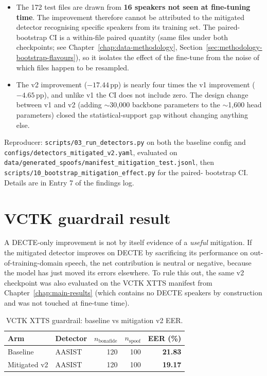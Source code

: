 \begin{itemize}
    \item The 172 test files are drawn from \textbf{16 speakers not seen at
        fine-tuning time}. The improvement therefore cannot be
        attributed to the mitigated detector recognising specific
        speakers from its training set. The paired-bootstrap CI is a
        within-file paired quantity (same files under both
        checkpoints; see Chapter~\ref{chap:data-methodology}, Section~\ref{sec:methodology-bootstrap-flavours}), so it isolates the
        effect of the fine-tune from the noise of which files happen
        to be resampled.
    \item The v2 improvement ($-17.44$\,pp) is nearly four times the v1
        improvement ($-4.65$\,pp), and unlike v1 the CI does not include
        zero. The design change between v1 and v2 (adding $\sim$30,000
        backbone parameters to the $\sim$1,600 head parameters) closed the
        statistical-support gap without changing anything else.
\end{itemize}

Reproducer: \texttt{scripts/03\_run\_detectors.py} on both the baseline
config and \texttt{configs/detectors\_mitigated\_v2.yaml}, evaluated on
\texttt{data/generated\_spoofs/manifest\_mitigation\_test.jsonl}, then
\texttt{scripts/10\_bootstrap\_mitigation\_effect.py} for the paired-%
bootstrap CI. Details are in Entry 7 of the findings log.


\section{VCTK guardrail result}
\label{sec:mitigation-vctk-guardrail}

A DECTE-only improvement is not by itself evidence of a \emph{useful}
mitigation. If the mitigated detector improves on DECTE by
sacrificing its performance on out-of-training-domain speech,
the net contribution is neutral or negative, because the model
has just moved its errors elsewhere. To rule this out, the same
v2 checkpoint was also evaluated on the VCTK XTTS manifest from
Chapter~\ref{chap:main-results} (which contains no DECTE speakers by construction and
was not touched at fine-tune time).

\begin{table}[t]
\centering
\caption{VCTK XTTS guardrail: baseline vs mitigation v2 EER.}
\label{tab:mitigation-vctk-guardrail}
\begin{tabularx}{\linewidth}{X l r r r}
\toprule
\textbf{Arm} & \textbf{Detector} & \textbf{$n_\text{bonafide}$} & \textbf{$n_\text{spoof}$} & \textbf{EER (\%)} \\
\midrule
Baseline     & AASIST & 120 & 100 & \textbf{21.83} \\
Mitigated v2 & AASIST & 120 & 100 & \textbf{19.17} \\
\bottomrule
\end{tabularx}
\end{table}

